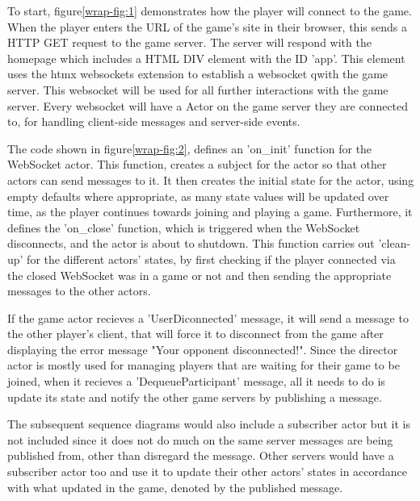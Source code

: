 \documentclass[]{project_interim}
\begin{document}
To start, figure\ref{wrap-fig:1} demonstrates how the player will connect to the game.
When the player enters the URL of the game's site in their browser, this sends a HTTP
GET request to the game server. The server will respond with the homepage which
includes a HTML DIV element with the ID 'app'. This element uses the htmx websockets
extension to establish a websocket qwith the game server. This websocket will be
used for all further interactions with the game server. Every websocket will have a
Actor on the game server they are connected to, for handling client-side messages and
server-side events.

The code shown in figure\ref{wrap-fig:2}, defines an 'on\_init' function for the WebSocket actor. This function,
creates a subject for the actor so that other actors can send messages to it.
It then creates the initial state for the actor, using empty defaults where appropriate,
as many state values will be updated over time, as the player continues towards
joining and playing a game. Furthermore, it defines the 'on\_close' function,
which is triggered when the WebSocket disconnects, and the actor is about to shutdown. This function carries out
'clean-up' for the different actors' states, by first checking if the player
connected via the closed WebSocket was in a game or not and then sending the
appropriate messages to the other actors.

If the game actor recieves a 'UserDiconnected'
message, it will send a message to the other player's client, that will force it to disconnect
from the game after displaying the error message "Your opponent disconnected!".
Since the director actor is mostly used for managing players that are waiting for
their game to be joined, when it recieves a 'DequeueParticipant' message, all it needs
to do is update its state and notify the other game servers by publishing a message.

The subsequent sequence diagrams would also include a subscriber actor
but it is not included since it does not do much on the same server
messages are being published from, other than disregard the message.
Other servers would have a subscriber actor too and use it to update
their other actors' states in accordance with what updated in the game,
denoted by the published message.

\newpage
\end{document}
